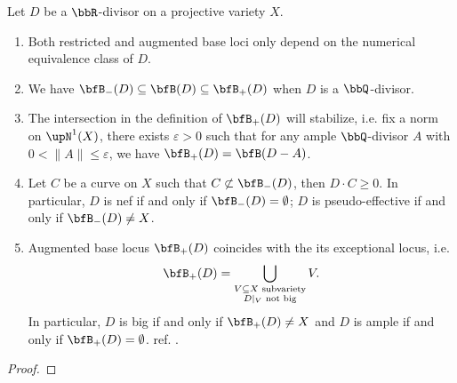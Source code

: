   \begin{theorem}\label{prop:properties_augmented_and_restricted_base_loci}
    Let $D$ be a $\bbR$-divisor on a projective variety $X$.
    \begin{enumerate}
      \item Both restricted and augmented base loci only depend on the numerical equivalence class of $D$.
      \item We have $\bfB_-(D) \subseteq \bfB(D) \subseteq \bfB_+(D)$ when $D$ is a $\bbQ$-divisor.
      \item The intersection in the definition of $\bfB_+(D)$ will stabilize, i.e. fix a norm on $\upN^1(X)$, there exists $\varepsilon > 0$ such that for any ample $\bbQ$-divisor $A$ with $0 < \|A\| \leq \varepsilon$, we have $\bfB_+(D) = \bfB(D - A)$.
      \item Let $C$ be a curve on $X$ such that $C \not\subset \bfB_-(D)$, then $D \cdot C \geq 0$.
        In particular, $D$ is nef if and only if $\bfB_-(D) = \emptyset$; $D$ is pseudo-effective if and only if $\bfB_-(D) \neq X$.
       \Yang{}
      \item Augmented base locus $\bfB_+(D)$ coincides with the its exceptional locus, i.e.
      \[ \bfB_+(D) = \bigcup_{\substack{V \subseteq X \text{ subvariety} \\ D|_V \text{ not big}}} V. \]
      In particular, $D$ is big if and only if $\bfB_+(D) \neq X$ and $D$ is ample if and only if $\bfB_+(D) = \emptyset$. ref. \cite{Birkar-2017-augmented-base-locus}.
    \end{enumerate}
    \Yang{}
  \end{theorem}
  \begin{proof}
    \Yang{}
  \end{proof}

  \Yang{}



